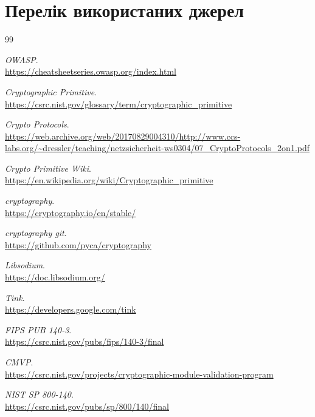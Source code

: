 \documentclass[12pt,a4paper]{article}
\begin{document}
\section*{Перелік використаних джерел}

\begin{thebibliography}{99} 

    \textit{OWASP}.
    \\
    \url{https://cheatsheetseries.owasp.org/index.html}


    \textit{Cryptographic Primitive}.
    \\
    \url{https://csrc.nist.gov/glossary/term/cryptographic_primitive}


    \textit{Crypto Protocols}.
    \\
    \url{https://web.archive.org/web/20170829004310/http://www.ccs-labs.org/~dressler/teaching/netzsicherheit-ws0304/07_CryptoProtocols_2on1.pdf}

    \textit{Crypto Primitive Wiki}.
    \\
    \url{https://en.wikipedia.org/wiki/Cryptographic_primitive}

    \textit{cryptography}.
    \\
    \url{https://cryptography.io/en/stable/}
 
    \textit{cryptography git}.
    \\
    \url{https://github.com/pyca/cryptography}   

    \textit{Libsodium}.
    \\
    \url{https://doc.libsodium.org/}

    \textit{Tink}.
    \\
    \url{https://developers.google.com/tink}

    \textit{FIPS PUB 140-3}.
    \\
    \url{https://csrc.nist.gov/pubs/fips/140-3/final}

    \textit{CMVP}.
    \\
    \url{https://csrc.nist.gov/projects/cryptographic-module-validation-program}

    \textit{NIST SP 800-140}.
    \\
    \url{https://csrc.nist.gov/pubs/sp/800/140/final}


\end{thebibliography}
\end{document}
